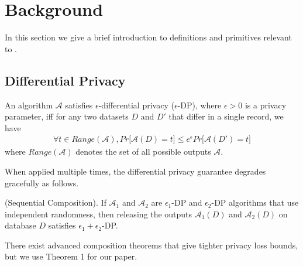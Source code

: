 
\section{Background}
In this section we give a brief introduction to definitions and primitives relevant to \system. 

\subsection{Differential Privacy}
\begin{definition} An algorithm $\mathcal{A}$
satisfies $\epsilon$-differential privacy ($\epsilon$-DP), where $\epsilon > 0$ is a privacy parameter, iff
 for any two datasets $D$ and $D'$ that differ in a single record, we have
\begin{gather}
\forall t \in Range(\mathcal{A}), Pr \big[\mathcal{A}(D) = t\big] \leq e^{\epsilon}Pr\big[\mathcal{A}(D') = t\big]
\end{gather}
where $Range(\mathcal{A})$ denotes the set of all possible outputs
$\mathcal{A}$.
\end{definition} 
When applied multiple times, the differential privacy guarantee degrades gracefully as follows.
\begin{theorem}(Sequential Composition). If $\mathcal{A}_1$ and
$\mathcal{A}_2$ are $\epsilon_1$-DP and $\epsilon_2$-DP algorithms that use independent randomness, then releasing the outputs $\mathcal{A}_1(D)$ and
$\mathcal{A}_2(D)$ on database $D$ satisfies $\epsilon_1+\epsilon_2$-DP.\end{theorem} 
There exist advanced composition theorems that give tighter privacy loss
bounds, but we
use Theorem 1 for our paper.
